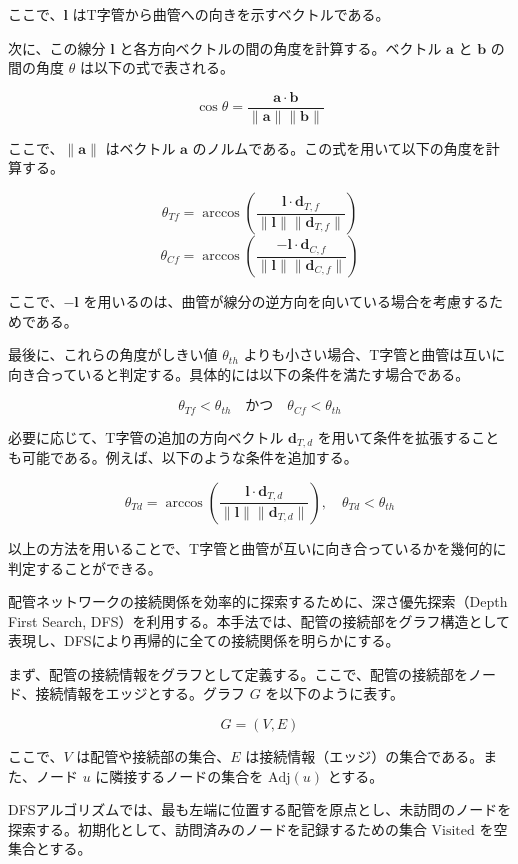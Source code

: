 ここで、$\mathbf{l}$ はT字管から曲管への向きを示すベクトルである。

次に、この線分 $\mathbf{l}$ と各方向ベクトルの間の角度を計算する。ベクトル $\mathbf{a}$ と $\mathbf{b}$ の間の角度 $\theta$ は以下の式で表される。

\[
\cos \theta = \frac{\mathbf{a} \cdot \mathbf{b}}{\|\mathbf{a}\| \|\mathbf{b}\|}
\]

ここで、$\|\mathbf{a}\|$ はベクトル $\mathbf{a}$ のノルムである。この式を用いて以下の角度を計算する。

\[
\theta_{Tf} = \arccos \left( \frac{\mathbf{l} \cdot \mathbf{d}_{T,f}}{\|\mathbf{l}\| \|\mathbf{d}_{T,f}\|} \right)
\]
\[
\theta_{Cf} = \arccos \left( \frac{-\mathbf{l} \cdot \mathbf{d}_{C,f}}{\|\mathbf{l}\| \|\mathbf{d}_{C,f}\|} \right)
\]

ここで、$-\mathbf{l}$ を用いるのは、曲管が線分の逆方向を向いている場合を考慮するためである。

最後に、これらの角度がしきい値 $\theta_{th}$ よりも小さい場合、T字管と曲管は互いに向き合っていると判定する。具体的には以下の条件を満たす場合である。

\[
\theta_{Tf} < \theta_{th} \quad \text{かつ} \quad \theta_{Cf} < \theta_{th}
\]

必要に応じて、T字管の追加の方向ベクトル $\mathbf{d}_{T,d}$ を用いて条件を拡張することも可能である。例えば、以下のような条件を追加する。

\[
\theta_{Td} = \arccos \left( \frac{\mathbf{l} \cdot \mathbf{d}_{T,d}}{\|\mathbf{l}\| \|\mathbf{d}_{T,d}\|} \right), \quad \theta_{Td} < \theta_{th}
\]

以上の方法を用いることで、T字管と曲管が互いに向き合っているかを幾何的に判定することができる。

配管ネットワークの接続関係を効率的に探索するために、深さ優先探索（Depth First Search, DFS）を利用する。本手法では、配管の接続部をグラフ構造として表現し、DFSにより再帰的に全ての接続関係を明らかにする。

まず、配管の接続情報をグラフとして定義する。ここで、配管の接続部をノード、接続情報をエッジとする。グラフ $G$ を以下のように表す。

\[
G = (V, E)
\]

ここで、$V$ は配管や接続部の集合、$E$ は接続情報（エッジ）の集合である。また、ノード $u$ に隣接するノードの集合を $\text{Adj}(u)$ とする。

DFSアルゴリズムでは、最も左端に位置する配管を原点とし、未訪問のノードを探索する。初期化として、訪問済みのノードを記録するための集合 $\text{Visited}$ を空集合とする。

